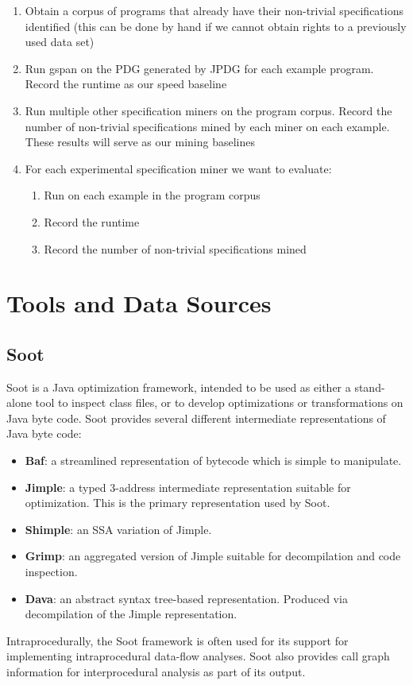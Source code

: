 \documentclass[12pt]{article}
\begin{document}
\begin{enumerate}
    \item Obtain a corpus of programs that already have their non-trivial specifications identified (this can be done by hand if we cannot obtain rights to a previously used data set)
    \item Run gspan on the PDG generated by JPDG for each example program. Record the runtime as our speed baseline
    \item Run multiple other specification miners on the program corpus. Record the number of non-trivial specifications mined by each miner on each example. These results will serve as our mining baselines
    \item For each experimental specification miner we want to evaluate:
    \begin{enumerate}
        \item Run on each example in the program corpus
        \item Record the runtime
        \item Record the number of non-trivial specifications mined
    \end{enumerate}
\end{enumerate}

\section{Tools and Data Sources}
\subsection{Soot}
Soot is a Java optimization framework, intended to be used as either a stand-alone tool to inspect class files, or to develop optimizations or transformations on Java byte code. Soot provides several different intermediate representations of Java byte code: \cite{lam11:_soot_java}
\begin{itemize}
    \item\textbf{Baf}: a streamlined representation of bytecode which is simple to manipulate.
    \item\textbf{Jimple}: a typed 3-address intermediate representation suitable for optimization. This is the primary representation used by Soot.
    \item\textbf{Shimple}: an SSA variation of Jimple.
    \item\textbf{Grimp}: an aggregated version of Jimple suitable for decompilation and code inspection.
    \item\textbf{Dava}: an abstract syntax tree-based representation. Produced via decompilation of the Jimple representation.
\end{itemize}
Intraprocedurally, the Soot framework is often used for its support for implementing intraprocedural data-flow analyses. Soot also provides call graph information for interprocedural analysis as part of its output. \cite{lam11:_soot_java}
\end{document}
